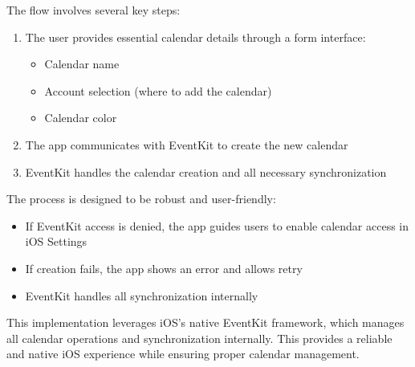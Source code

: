 The flow involves several key steps:
\begin{enumerate}
  \item The user provides essential calendar details through a form interface:
        \begin{itemize}
          \item Calendar name
          \item Account selection (where to add the calendar)
          \item Calendar color
        \end{itemize}
  \item The app communicates with EventKit to create the new calendar
  \item EventKit handles the calendar creation and all necessary synchronization
\end{enumerate}

The process is designed to be robust and user-friendly:
\begin{itemize}
  \item If EventKit access is denied, the app guides users to enable calendar access in iOS Settings
  \item If creation fails, the app shows an error and allows retry
  \item EventKit handles all synchronization internally
\end{itemize}

This implementation leverages iOS's native EventKit framework, which manages all calendar operations and synchronization internally. This provides a reliable and native iOS experience while ensuring proper calendar management.